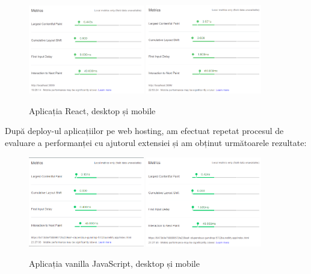 \documentclass[12pt, a4paper]{report}
\begin{document}
\begin{figure}[htbp]
	\centering
	\includegraphics[width=0.45\textwidth]{02_desktop.png}
	\includegraphics[width=0.45\textwidth]{02_mobile.png}
	\caption{Aplicația React, desktop și mobile}
	\label{fig:02-local}
\end{figure}

După deploy-ul aplicațiilor pe web hosting, am efectuat repetat procesul de evaluare a performanței cu ajutorul extensiei și am obținut următoarele rezultate:

\begin{figure}[htbp]
	\centering
	\includegraphics[width=0.45\textwidth]{01_desktop_deployed.png}
	\includegraphics[width=0.45\textwidth]{01_mobile_deployed.png}
	\caption{Aplicația vanilla JavaScript, desktop și mobile}
	\label{fig:01-deployed}
\end{figure}
\end{document}
